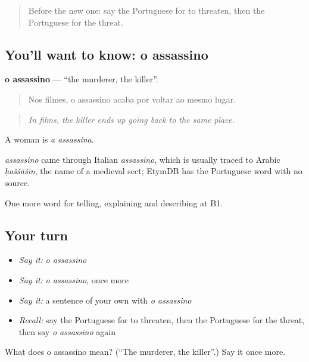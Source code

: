 \label{lesson:PT-C290-assassino}



\begin{quote}
Before the new one: say the Portuguese for to threaten, then the Portuguese for the threat.
\end{quote}

\subsection*{You'll want to know: o assassino}
\textbf{o assassino} — \textquotedblleft{}the murderer, the killer\textquotedblright{}.

\begin{quote}
Nos filmes, o assassino acaba por voltar ao mesmo lugar.
\end{quote}

\begin{quote}
\emph{In films, the killer ends up going back to the same place.}
\end{quote}

A woman is \emph{a assassina}.

\begin{cousinweb}
\emph{assassino} came through Italian \emph{assassino}, which is usually traced to Arabic \emph{ḥaššāšīn}, the name of a medieval sect; EtymDB has the Portuguese word with no source.
\end{cousinweb}

\begin{grammarlens}[title={What you've built}]
One more word for telling, explaining and describing at B1.
\end{grammarlens}

\subsection*{Your turn}
\begin{itemize}
\raggedright
  \item \emph{Say it:} \emph{o assassino}
  \item \emph{Say it:} \emph{o assassino}, once more
  \item \emph{Say it:} a sentence of your own with \emph{o assassino}
  \item \emph{Recall:} say the Portuguese for to threaten, then the Portuguese for the threat, then say \emph{o assassino} again
\end{itemize}

\begin{tcolorbox}[breakable,colback=teal!4,colframe=teal!35!black,title={Before you move on}]
What does o assassino mean? (\textquotedblleft{}The murderer, the killer\textquotedblright{}.) Say it once more.
\end{tcolorbox}
